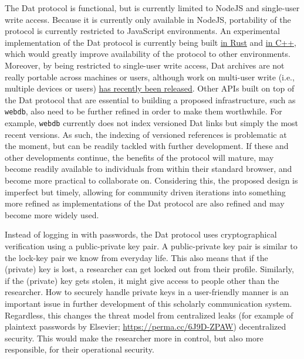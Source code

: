 \documentclass[a5paper]{book}
\begin{document}
The Dat protocol is functional, but is currently limited to NodeJS and
single-user write access. Because it is currently only available in
NodeJS, portability of the protocol is currently restricted to
JavaScript environments. An experimental implementation of the Dat
protocol is currently being built \href{https://github.com/datrs}{in
Rust} and \href{https://github.com/datcxx}{in C++}, which would greatly
improve availability of the protocol to other environments. Moreover, by
being restricted to single-user write access, Dat archives are not
really portable across machines or users, although work on multi-user
write (i.e., multiple devices or users)
\href{https://github.com/mafintosh/hyperdb}{has recently been released}.
Other APIs built on top of the Dat protocol that are essential to
building a proposed infrastructure, such as \texttt{webdb}, also need to
be further refined in order to make them worthwhile. For example,
\texttt{webdb} currently does not index versioned Dat links but simply
the most recent versions. As such, the indexing of versioned references
is problematic at the moment, but can be readily tackled with further
development. If these and other developments continue, the benefits of
the protocol will mature, may become readily available to individuals
from within their standard browser, and become more practical to
collaborate on. Considering this, the proposed design is imperfect but
timely, allowing for community driven iterations into something more
refined as implementations of the Dat protocol are also refined and may
become more widely used.

Instead of logging in with passwords, the Dat protocol uses
cryptographical verification using a public-private key pair. A
public-private key pair is similar to the lock-key pair we know from
everyday life. This also means that if the (private) key is lost, a
researcher can get locked out from their profile. Similarly, if the
(private) key gets stolen, it might give access to people other than the
researcher. How to securely handle private keys in a user-friendly
manner is an important issue in further development of this scholarly
communication system. Regardless, this changes the threat model from
centralized leaks (for example of plaintext passwords by Elsevier;
\url{https://perma.cc/6J9D-ZPAW}) decentralized security. This would
make the researcher more in control, but also more responsible, for
their operational security.
\end{document}
